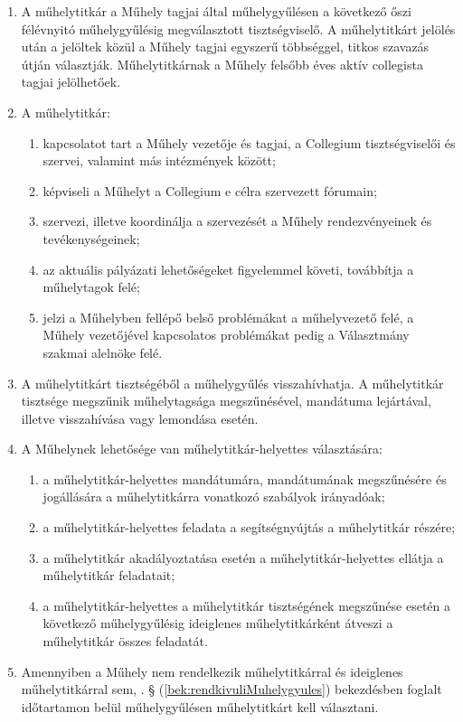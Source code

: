 \documentclass{../styles/rulebook}
\begin{document}
\begin{enumerate}
	\item A műhelytitkár a Műhely tagjai által műhelygyűlésen a következő őszi félévnyitó műhelygyűlésig megválasztott tisztségviselő. A műhelytitkárt jelölés után a jelöltek közül a Műhely tagjai egyszerű többséggel, titkos szavazás útján választják. Műhelytitkárnak a Műhely felsőbb éves aktív collegista tagjai jelölhetőek.
	\item A műhelytitkár:
	      \begin{enumerate}
		      \item kapcsolatot tart a Műhely vezetője és tagjai, a Collegium tisztségviselői és szervei, valamint más intézmények között;
		      \item képviseli a Műhelyt a Collegium e célra szervezett fórumain;
		      \item szervezi, illetve koordinálja a szervezését a Műhely rendezvényeinek és tevékenységeinek;
		      \item az aktuális pályázati lehetőségeket figyelemmel követi, továbbítja a műhelytagok felé;
		      \item jelzi a Műhelyben fellépő belső problémákat a műhelyvezető felé, a Műhely vezetőjével kapcsolatos problémákat pedig a Választmány szakmai alelnöke felé.
	      \end{enumerate}
	\item A műhelytitkárt tisztségéből a műhelygyűlés visszahívhatja. A műhelytitkár tisztsége megszűnik műhelytagsága megszűnésével, mandátuma lejártával, illetve visszahívása vagy lemondása esetén.
	\item A Műhelynek lehetősége van műhelytitkár-helyettes választására:
	      \begin{enumerate}
		      \item a műhelytitkár-helyettes mandátumára, mandátumának megszűnésére és jogállására a műhelytitkárra vonatkozó szabályok irányadóak;
		      \item a műhelytitkár-helyettes feladata a segítségnyújtás a műhelytitkár részére;
		      \item a műhelytitkár akadályoztatása esetén a műhelytitkár-helyettes ellátja a műhelytitkár feladatait;
		      \item a műhelytitkár-helyettes a műhelytitkár tisztségének megszűnése esetén a következő műhelygyűlésig ideiglenes műhelytitkárként átveszi a műhelytitkár összes feladatát.
	      \end{enumerate}
	\item Amennyiben a Műhely nem rendelkezik műhelytitkárral és ideiglenes műhelytitkárral sem, . § (\ref{bek:rendkivuliMuhelygyules}) bekezdésben foglalt időtartamon belül műhelygyűlésen műhelytitkárt kell választani.
\end{enumerate}
\end{document}
